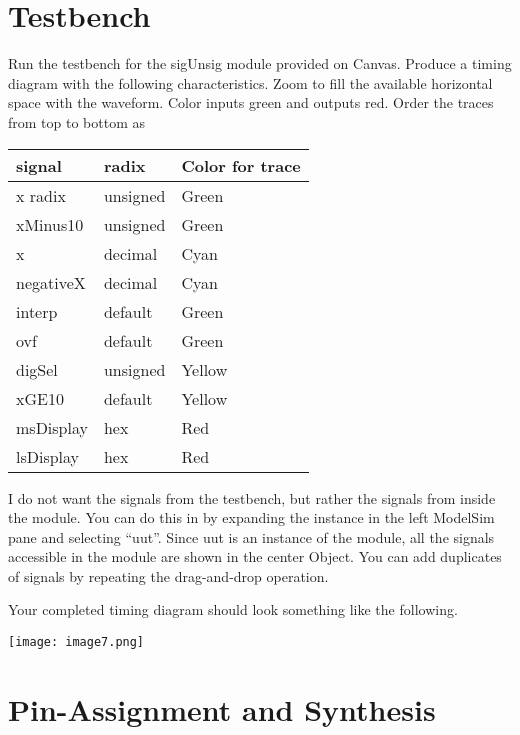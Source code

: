     \section{Testbench}
    \label{section:calcTestbench}
    Run the testbench for the sigUnsig module provided on Canvas. Produce
    a timing diagram with the following characteristics. Zoom to fill the
    available horizontal space with the waveform. Color inputs green and
    outputs red. Order the traces from top to bottom as

    \begin{tabular}{p{3cm}p{3cm}p{3cm}}
        signal            & radix                & Color for trace \\ \hline
        x radix         &    unsigned         & Green  \\
        xMinus10         &     unsigned     & Green  \\
        x                 &  decimal         & Cyan  \\
        negativeX         &  decimal         & Cyan  \\
        interp             & default             & Green  \\
        ovf             & default             & Green  \\
        digSel             &  unsigned         & Yellow  \\
        xGE10         & default             & Yellow  \\
        msDisplay         &  hex             & Red  \\
        lsDisplay         &  hex             & Red  \\
    \end{tabular}

    I do not want the signals from the testbench, but rather the signals
    from inside the  module. You can do this in  by
    expanding the  instance in the left ModelSim pane and
    selecting ``uut''. Since uut is an instance of the  module, all
    the signals accessible in the  module are shown in the center
    Object. You can add duplicates of signals by repeating the drag-and-drop
    operation.

    Your completed timing diagram should look something like the following.

    \texttt{[image:  image7.png]}

    \section{Pin-Assignment and Synthesis}


